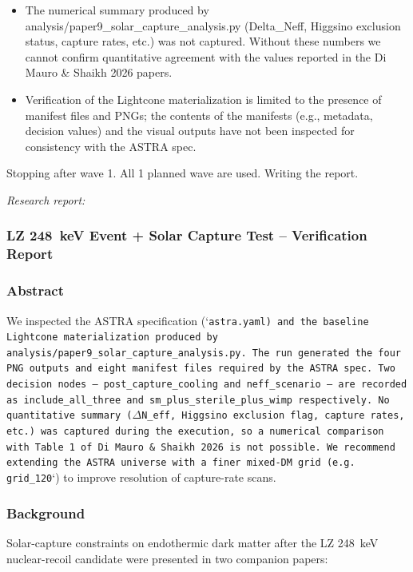 \documentclass[11pt,a4paper]{article}
\begin{document}
\begin{itemize}
  \item The numerical summary produced by analysis/paper9\_solar\_capture\_analysis.py (Delta\_Neff, Higgsino exclusion status, capture rates, etc.) was not captured. Without these numbers we cannot confirm quantitative agreement with the values reported in the Di Mauro \& Shaikh 2026 papers.
  \item Verification of the Lightcone materialization is limited to the presence of manifest files and PNGs; the contents of the manifests (e.g., metadata, decision values) and the visual outputs have not been inspected for consistency with the ASTRA spec.
\end{itemize}
Stopping after wave 1. All 1 planned wave are used. Writing the report.

\textit{Research report:}\par
\subsubsection*{LZ 248~keV Event + Solar Capture Test -- Verification Report}
\subsubsection*{Abstract}
We inspected the ASTRA specification (`\texttt{astra.yaml}\texttt{)\allowbreak{} and the baseline Lightcone materialization produced by }\texttt{analysis/\allowbreak{}paper9\_\allowbreak{}solar\_\allowbreak{}capture\_\allowbreak{}analysis.py}\texttt{. The run generated the four PNG outputs and eight manifest files required by the ASTRA spec. Two decision nodes -- }\texttt{post\_\allowbreak{}capture\_\allowbreak{}cooling}\texttt{ and }\texttt{neff\_\allowbreak{}scenario}\texttt{ -- are recorded as }\texttt{include\_\allowbreak{}all\_\allowbreak{}three}\texttt{ and }\texttt{sm\_\allowbreak{}plus\_\allowbreak{}sterile\_\allowbreak{}plus\_\allowbreak{}wimp}\texttt{ respectively. No quantitative summary ($\Delta$N\_\allowbreak{}eff,\allowbreak{} Higgsino exclusion flag,\allowbreak{} capture rates,\allowbreak{} etc.)\allowbreak{} was captured during the execution,\allowbreak{} so a numerical comparison with Table~1 of Di~Mauro~\&~Shaikh~2026 is not possible. We recommend extending the ASTRA universe with a finer mixed-DM grid (e.g. }\texttt{grid\_\allowbreak{}120}`) to improve resolution of capture-rate scans.

\subsubsection*{Background}
Solar-capture constraints on endothermic dark matter after the LZ 248~keV nuclear-recoil candidate were presented in two companion papers:
\end{document}
